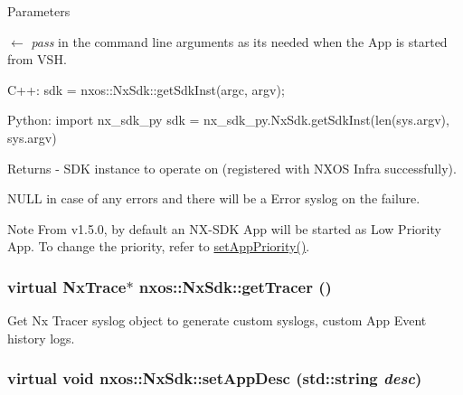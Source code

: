 \begin{DoxyParams}{Parameters}
\item[\mbox{$\leftarrow$} {\em pass}]in the command line arguments as its needed when the App is started from VSH.\end{DoxyParams}

\begin{DoxyCode}
  C++:
       sdk = nxos::NxSdk::getSdkInst(argc, argv);

  Python:
       import nx_sdk_py
       sdk = nx_sdk_py.NxSdk.getSdkInst(len(sys.argv), sys.argv)
\end{DoxyCode}
 \begin{DoxyReturn}{Returns}
-\/ SDK instance to operate on (registered with NXOS Infra successfully).
\begin{DoxyItemize}
\item NULL in case of any errors and there will be a Error syslog on the failure.
\end{DoxyItemize}
\end{DoxyReturn}
\begin{DoxyNote}{Note}
From v1.5.0, by default an NX-\/SDK App will be started as Low Priority App. To change the priority, refer to \hyperlink{classnxos_1_1NxSdk_a46d9487216506aa19e5499759f5eaef7}{setAppPriority()}. 
\end{DoxyNote}
\hypertarget{classnxos_1_1NxSdk_ad2c729bd12d1b9f4bf06f4b70fe28347}{
\subsubsection[{getTracer}]{\setlength{\rightskip}{0pt plus 5cm}virtual {\bf NxTrace}$\ast$ nxos::NxSdk::getTracer ()}}
\label{classnxos_1_1NxSdk_ad2c729bd12d1b9f4bf06f4b70fe28347}
Get Nx Tracer syslog object to generate custom syslogs, custom App Event history logs. \hypertarget{classnxos_1_1NxSdk_a2c6007a383114285951b2d2a062dacec}{
\subsubsection[{setAppDesc}]{\setlength{\rightskip}{0pt plus 5cm}virtual void nxos::NxSdk::setAppDesc (std::string {\em desc})}}

